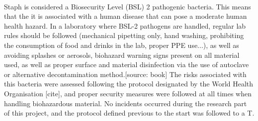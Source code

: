 \paragraph{}Staph is considered a Biosecurity Level (BSL) 2 pathogenic bacteria. This means that the it is associated with a human disease that can pose a moderate human health hazard. In a laboratory where BSL-2 pathogens are handled, regular lab rules should be followed (mechanical pipetting only, hand washing, prohibiting the consumption of food and drinks in the lab, proper PPE use...), as well as avoiding splashes or aerosols, biohazard warning signs present on all material used, as well as proper surface and material disinfection via the use of autoclave or alternative decontamination method.[source: book] The risks associated with this bacteria were assessed following the protocol designated by the World Health Organisation [cite], and proper security measures were followed at all times when handling biohazardous material. No incidents occurred during the research part of this project, and the protocol defined previous to the start was followed to a T.
